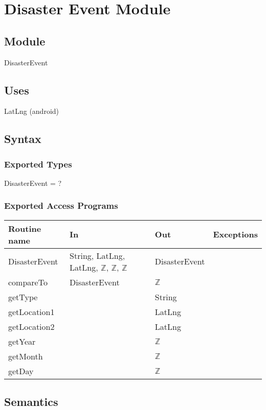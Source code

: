\documentclass[12pt]{article}
\begin{document}
\section* {Disaster Event Module}

\subsection* {Module}

DisasterEvent

\subsection* {Uses}

LatLng (android)

\subsection* {Syntax}

\subsubsection* {Exported Types}

DisasterEvent = ?

\subsubsection* {Exported Access Programs}

\begin{tabular}{| l | l | l | l |}
\hline
\textbf{Routine name} & \textbf{In} & \textbf{Out} & \textbf{Exceptions}\\
\hline
DisasterEvent & String, LatLng, LatLng, $\mathbb{Z}$, $\mathbb{Z}$, $\mathbb{Z}$ & DisasterEvent & \\
\hline
compareTo & DisasterEvent & $\mathbb{Z}$ & ~ \\
\hline
getType & ~ & String & ~ \\
\hline
getLocation1 & ~ & LatLng & ~ \\
\hline
getLocation2 & ~ & LatLng & ~ \\
\hline
getYear & ~ & $\mathbb{Z}$ & ~ \\
\hline
getMonth & ~ & $\mathbb{Z}$ & ~ \\
\hline
getDay & ~ & $\mathbb{Z}$ & ~ \\
\hline
\end{tabular}

\subsection* {Semantics}
\end{document}
